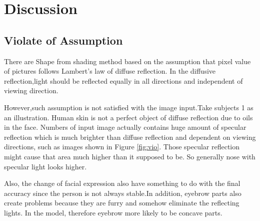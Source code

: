 \documentclass[a4paper]{article}
\begin{document}
\section{Discussion}
\subsection{Violate of Assumption}
There are Shape from shading method based on the assumption that pixel value of pictures follows Lambert's law of diffuse reflection. In the diffusive reflection,light should be reflected equally in all directions and independent of viewing direction. 

However,such assumption is not satisfied with the image input.Take subjects 1 as an illustration. Human skin is not a perfect object of diffuse reflection due to oils in the face. Numbers of input image actually contains huge amount of specular reflection which is much brighter than diffuse reflection and dependent on viewing directions, such as images shown in Figure \ref{fig:vio}. Those specular reflection might cause that area much higher than it supposed to be. So generally nose with specular light looks higher.

Also, the change of facial expression also have something to do with the final accuracy since the person is not always stable.In addition, eyebrow parts also create problems because they are furry and somehow eliminate the reflecting lights. In the model, therefore eyebrow more likely to be concave parts.
\end{document}
